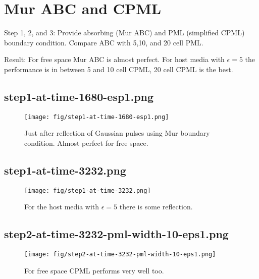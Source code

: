\documentclass[fullscreen=true]{beamer}
\begin{document}
\section{Mur ABC and CPML}
\begin{frame}
  \begin{block}{Step 1, 2, and 3:}
    Provide absorbing (Mur ABC) and PML (simplified CPML) boundary
    condition. Compare ABC with  5,10, and 20 cell PML.
  \end{block}
  \begin{block}{Result:}
    For free space Mur ABC is almost perfect. For host media with
    $\epsilon = 5$ the performance is in between 5 and 10 cell CPML,
    20 cell CPML is the best.
  \end{block}
\end{frame}
\subsection{step1-at-time-1680-esp1.png}
\begin{frame}
  \begin{figure}
    \texttt{[image: fig/step1-at-time-1680-esp1.png]}%
    \caption{Just after reflection of Gaussian pulses using Mur
      boundary condition. Almost perfect for free space.}
  \end{figure}
\end{frame}

\subsection{step1-at-time-3232.png}
\begin{frame}
  \begin{figure}
    \texttt{[image: fig/step1-at-time-3232.png]}%
    \caption{For the host media with $\epsilon=5$ there is some reflection.}
  \end{figure}
\end{frame}


\subsection{step2-at-time-3232-pml-width-10-eps1.png}
\begin{frame}
  \begin{figure}
    \texttt{[image: fig/step2-at-time-3232-pml-width-10-eps1.png]}%
    \caption{For free space CPML performs very well too.}
  \end{figure}
\end{frame}
\end{document}
